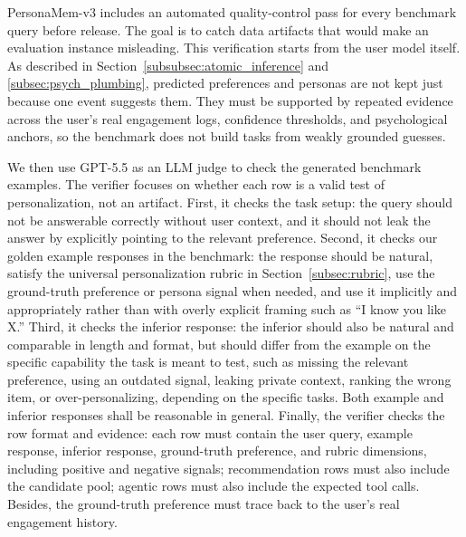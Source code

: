 \documentclass[]{fairmeta}
\begin{document}
PersonaMem-v3 includes an automated quality-control pass for every benchmark query before release. The goal is to catch data artifacts that would make an evaluation instance misleading. This verification starts from the user model itself. As described in Section~\ref{subsubsec:atomic_inference} and \ref{subsec:psych_plumbing}, predicted preferences and personas are not kept just because one event suggests them. They must be supported by repeated evidence across the user's real engagement logs, confidence thresholds, and psychological anchors, so the benchmark does not build tasks from weakly grounded guesses. 

We then use GPT-5.5 as an LLM judge to check the generated benchmark examples. The verifier focuses on whether each row is a valid test of personalization, not an artifact. First, it checks the task setup: the query should not be answerable correctly without user context, and it should not leak the answer by explicitly pointing to the relevant preference. Second, it checks our golden example responses in the benchmark: the response should be natural, satisfy the universal personalization rubric in Section~\ref{subsec:rubric}, use the ground-truth preference or persona signal when needed, and use it implicitly and appropriately rather than with overly explicit framing such as “I know you like X.” Third, it checks the inferior response: the inferior should also be natural and comparable in length and format, but should differ from the example on the specific capability the task is meant to test, such as missing the relevant preference, using an outdated signal, leaking private context, ranking the wrong item, or over-personalizing, depending on the specific tasks. Both example and inferior responses shall be reasonable in general. Finally, the verifier checks the row format and evidence: each row must contain the user query, example response, inferior response, ground-truth preference, and rubric dimensions, including positive and negative signals; recommendation rows must also include the candidate pool; agentic rows must also include the expected tool calls. Besides, the ground-truth preference must trace back to the user's real engagement history.
\end{document}
